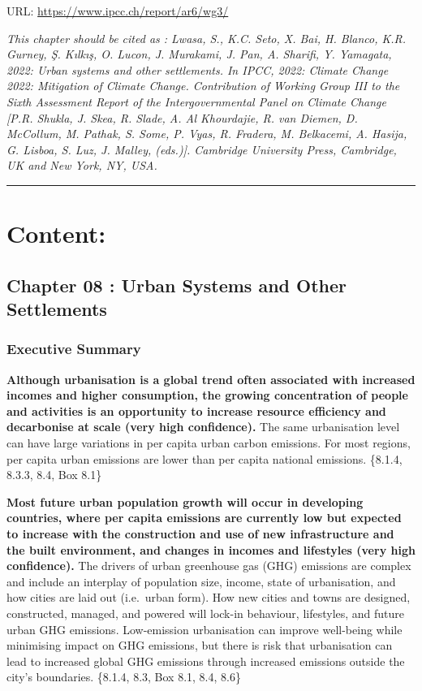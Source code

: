\documentclass[
  letterpaper,
  DIV=11,
  numbers=noendperiod]{scrreprt}
\begin{document}
URL: \url{https://www.ipcc.ch/report/ar6/wg3/}

\emph{This chapter should be cited as : Lwasa, S., K.C. Seto, X. Bai, H.
Blanco, K.R. Gurney, Ş. Kılkış, O. Lucon, J. Murakami, J. Pan, A.
Sharifi, Y. Yamagata, 2022: Urban systems and other settlements. In
IPCC, 2022: Climate Change 2022: Mitigation of Climate Change.
Contribution of Working Group III to the Sixth Assessment Report of the
Intergovernmental Panel on Climate Change {[}P.R. Shukla, J. Skea, R.
Slade, A. Al Khourdajie, R. van Diemen, D. McCollum, M. Pathak, S. Some,
P. Vyas, R. Fradera, M. Belkacemi, A. Hasija, G. Lisboa, S. Luz, J.
Malley, (eds.){]}. Cambridge University Press, Cambridge, UK and New
York, NY, USA.}

\begin{center}\rule{0.5\linewidth}{0.5pt}\end{center}

\hypertarget{content}{%
\section{Content:}\label{content}}

\hypertarget{chapter-08-urban-systems-and-other-settlements}{%
\subsection{Chapter 08 : Urban Systems and Other
Settlements}\label{chapter-08-urban-systems-and-other-settlements}}

\hypertarget{executive-summary}{%
\subsubsection{Executive Summary}\label{executive-summary}}

\textbf{Although urbanisation is a global trend often associated with
increased incomes and higher consumption, the growing concentration of
people and activities is an opportunity to increase resource efficiency
and decarbonise at scale (very high confidence).} The same urbanisation
level can have large variations in per capita urban carbon emissions.
For most regions, per capita urban emissions are lower than per capita
national emissions. \{8.1.4, 8.3.3, 8.4, Box 8.1\}

\textbf{Most future urban population growth will occur in developing
countries, where per capita emissions are currently low but expected to
increase with the construction and use of new infrastructure and the
built environment, and changes in incomes and lifestyles (very high
confidence).} The drivers of urban greenhouse gas (GHG) emissions are
complex and include an interplay of population size, income, state of
urbanisation, and how cities are laid out (i.e.~urban form). How new
cities and towns are designed, constructed, managed, and powered will
lock-in behaviour, lifestyles, and future urban GHG emissions.
Low-emission urbanisation can improve well-being while minimising impact
on GHG emissions, but there is risk that urbanisation can lead to
increased global GHG emissions through increased emissions outside the
city's boundaries. \{8.1.4, 8.3, Box 8.1, 8.4, 8.6\}
\end{document}
